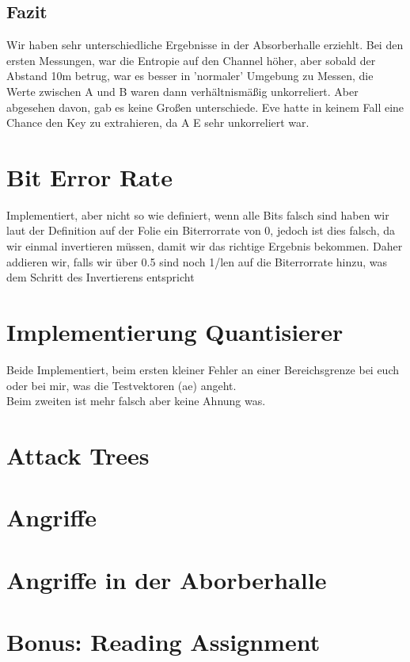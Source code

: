 \documentclass[12pt,a4paper]{article}
\begin{document}
\subsection*{Fazit}
Wir haben sehr unterschiedliche Ergebnisse in der Absorberhalle erziehlt. Bei den ersten Messungen, war die Entropie auf den Channel höher, aber sobald der Abstand 10m betrug, war es besser in 'normaler' Umgebung zu Messen, die Werte zwischen A und B waren dann verhältnismäßig unkorreliert. Aber abgesehen davon, gab es keine Großen unterschiede. Eve hatte in keinem Fall eine Chance den Key zu extrahieren, da A E sehr unkorreliert war.
\clearpage
\section{Bit Error Rate}
Implementiert, aber nicht so wie definiert, wenn alle Bits falsch sind haben wir laut der Definition auf der Folie ein Biterrorrate von 0, jedoch ist dies falsch, da wir einmal invertieren müssen, damit wir das richtige Ergebnis bekommen. Daher addieren wir, falls wir über 0.5 sind noch 1/len auf die Biterrorrate hinzu, was dem Schritt des Invertierens entspricht
\section{Implementierung Quantisierer}
Beide Implementiert, beim ersten kleiner Fehler an einer Bereichsgrenze bei euch oder bei mir, was die Testvektoren (ae) angeht.\\
Beim zweiten ist mehr falsch aber keine Ahnung was.
\section{Attack Trees}
\section{Angriffe}
\section{Angriffe in der Aborberhalle}
\section{Bonus: Reading Assignment}
\end{document}
